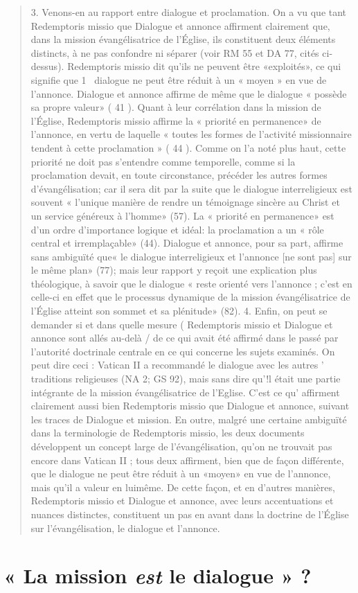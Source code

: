\begin{quote}
3. Venons-en au rapport entre dialogue et proclamation. On
a vu que tant Redemptoris missio que Dialogue et annonce
affirment clairement que, dans la mission évangélisatrice de
l'Église, ils constituent deux éléments distincts, à ne pas
confondre ni séparer (voir RM 55 et DA 77, cités ci-dessus).
Redemptoris missio dit qu'ils ne peuvent être «exploités», ce
qui signifie que 1~ dialogue ne peut être réduit à un « moyen »
en vue de l'annonce. Dialogue et annonce affirme de même
que le dialogue « possède sa propre valeur» ( 41 ). Quant à leur
corrélation dans la mission de l'Église, Redemptoris missio
affirme la « priorité en permanence» de l'annonce, en vertu de
laquelle « toutes les formes de l'activité missionnaire tendent
à cette proclamation » ( 44 ). Comme on l'a noté plus haut, cette
priorité ne doit pas s'entendre comme temporelle, comme si la
proclamation devait, en toute circonstance, précéder les autres
formes d'évangélisation; car il sera dit par la suite que le dialogue
interreligieux est souvent « l'unique manière de rendre
un témoignage sincère au Christ et un service généreux à
l'homme» (57). La « priorité en permanence» est d'un ordre
d'importance logique et idéal: la proclamation a un « rôle central
et irremplaçable» (44). Dialogue et annonce, pour sa part,
affirme sans ambiguïté que« le dialogue interreligieux et l'annonce
[ne sont pas] sur le même plan» (77); mais leur rapport
y reçoit une explication plus théologique, à savoir que le dialogue
« reste orienté vers l'annonce ; c'est en celle-ci en effet
que le processus dynamique de la mission évangélisatrice de
l'Église atteint son sommet et sa plénitude» (82).
4. Enfin, on peut se demander si et dans quelle mesure
( Redemptoris missio et Dialogue et annonce sont allés au-delà
/ de ce qui avait été affirmé dans le passé par l'autorité doctrinale
centrale en ce qui concerne les sujets examinés. On peut
dire ceci : Vatican II a recommandé le dialogue avec les autres
' traditions religieuses (NA 2; GS 92), mais sans dire qu'!l était
une partie intégrante de la mission évangélisatrice de l'Eglise.
C'est ce qu' affirment clairement aussi bien Redemptoris missio
que Dialogue et annonce, suivant les traces de Dialogue et
mission. En outre, malgré une certaine ambiguïté dans la terminologie
de Redemptoris missio, les deux documents développent
un concept large de l'évangélisation, qu'on ne trouvait
pas encore dans Vatican II ; tous deux affirment, bien que de
façon différente, que le dialogue ne peut être réduit à un
«moyen» en vue de l'annonce, mais qu'il a valeur en luimême.
De cette façon, et en d'autres manières, Redemptoris
missio et Dialogue et annonce, avec leurs accentuations et
nuances distinctes, constituent un pas en avant dans la doctrine
de l'Église sur l'évangélisation, le dialogue et l'annonce.
\end{quote}

\section{« La mission \textit{est} le dialogue » ?}